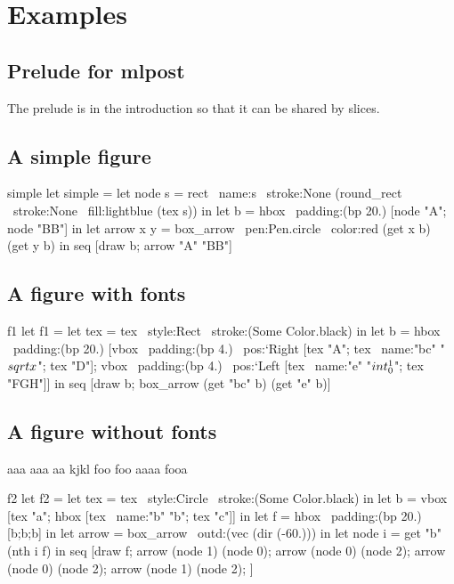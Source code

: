 \documentclass{article}
\begin{document}
\section{Examples}

\subsection{Prelude for mlpost}

The prelude is in the introduction so that it can be shared by slices.

\subsection{A simple figure}

\begin{mlpost}[scale=3]{simple}
let simple =
  let node s =
    rect ~name:s ~stroke:None (round_rect ~stroke:None ~fill:lightblue (tex s))
  in
  let b = hbox ~padding:(bp 20.) [node "A"; node "BB"] in
  let arrow x y = box_arrow ~pen:Pen.circle ~color:red (get x b) (get y b) in
  seq [draw b; arrow "A" "BB"]
\end{mlpost}

\subsection{A figure with fonts}

\begin{mlpost}[scale=2]{f1}
let f1 =
  let tex = tex ~style:Rect ~stroke:(Some Color.black) in
  let b = 
    hbox ~padding:(bp 20.)
      [vbox ~padding:(bp 4.) ~pos:`Right 
        [tex "A"; tex ~name:"bc" "$\\sqrt{x}$"; tex "D"];
       vbox ~padding:(bp 4.) ~pos:`Left  
	 [tex ~name:"e" "$\\int _0 ^1$"; tex "FGH"]]
  in
  seq [draw b;
       box_arrow (get "bc" b) (get "e" b)]
\end{mlpost}

\subsection{A figure without fonts}

aaa aaa aa kjkl  foo foo  aaaa fooa

\begin{mlpost}{f2}
let f2 =
  let tex = tex ~style:Circle ~stroke:(Some Color.black) in 
  let b = vbox [tex "a"; hbox [tex ~name:"b" "b"; tex "c"]] in
  let f = hbox ~padding:(bp 20.) [b;b;b] in
  let arrow = box_arrow ~outd:(vec (dir (-60.))) in
  let node i = get "b" (nth i f) in
  seq [draw f;
       arrow (node 1) (node 0); 
       arrow (node 0) (node 2); 
       arrow (node 0)  (node 2); 
       arrow (node 1) (node 2);
      ]
\end{mlpost}
\end{document}
